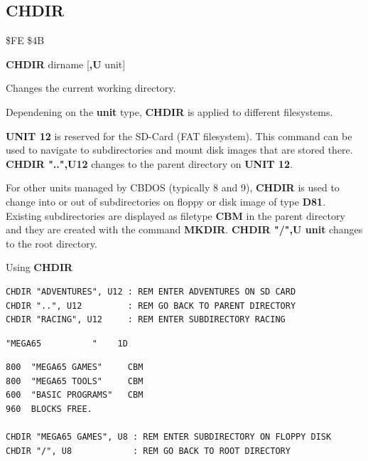 \subsection{CHDIR}
\begin{description}[leftmargin=2cm,style=nextline]
\item [Token:]    \$FE \$4B

\item [Format:]   {\bf CHDIR} dirname [{\bf,U} unit]

\item [Usage:]    Changes the current working directory.

                  \dirnamedefinition

                  Dependening on the {\bf unit} type, {\bf CHDIR} is applied to different filesystems.

                  {\bf UNIT 12} is reserved for the SD-Card (FAT filesystem). This command can be used to navigate to subdirectories and mount disk images that are stored there. {\bf CHDIR "..",U12} changes to the parent directory on {\bf UNIT 12}.

                  For other units managed by CBDOS (typically 8 and 9), {\bf CHDIR} is used to change into or out of subdirectories on floppy or disk image of type {\bf D81}. Existing subdirectories are displayed as filetype {\bf CBM} in the parent directory and they are created with the command {\bf MKDIR}. {\bf CHDIR "/",U unit} changes to the root directory.

\item [Examples:] Using {\bf CHDIR}

\begin{tcolorbox}[colback=black,coltext=white]
\verbatimfont{\codefont}
\begin{verbatim}
CHDIR "ADVENTURES", U12 : REM ENTER ADVENTURES ON SD CARD
CHDIR "..", U12         : REM GO BACK TO PARENT DIRECTORY
CHDIR "RACING", U12     : REM ENTER SUBDIRECTORY RACING
\end{verbatim}

\selectfont{\codefont 0}
\begin{tcolorbox}[colback=white,coltext=black,arc=0mm,boxrule=0mm,
       left*=0.5mm,right*=0mm,top=0mm,bottom=0mm,nobeforeafter,
       left skip=0.5mm,
       width=28mm,height=3mm,valign=center]
\begin{verbatim}
"MEGA65          "    1D
\end{verbatim}
\end{tcolorbox}
\begin{verbatim}
800  "MEGA65 GAMES"     CBM
800  "MEGA65 TOOLS"     CBM
600  "BASIC PROGRAMS"   CBM
960  BLOCKS FREE.

CHDIR "MEGA65 GAMES", U8 : REM ENTER SUBDIRECTORY ON FLOPPY DISK
CHDIR "/", U8            : REM GO BACK TO ROOT DIRECTORY
\end{verbatim}
\end{tcolorbox}
\end{description}

